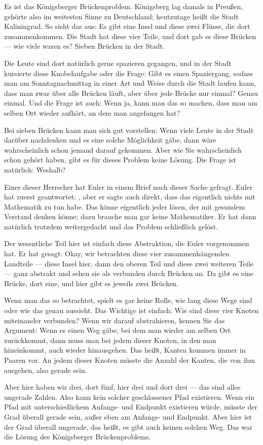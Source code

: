 \begin{spoken-clean}[00:05:40 - 00:08:08]
Es ist das Königsberger Brückenproblem. Königsberg lag damals in Preußen, gehörte also im weitesten Sinne zu Deutschland; heutzutage heißt die Stadt Kaliningrad. So sieht das aus: Es gibt eine Insel und diese zwei Flüsse, die dort zusammenkommen. Die Stadt hat diese vier Teile, und dort gab es diese Brücken --- wie viele waren es? Sieben Brücken in der Stadt.

Die Leute sind dort natürlich gerne spazieren gegangen, und in der Stadt kursierte diese Knobelaufgabe oder die Frage: Gibt es einen Spaziergang, sodass man am Sonntagnachmittag in einer Art und Weise durch die Stadt laufen kann, dass man zwar über alle Brücken läuft, aber über jede Brücke nur einmal? Genau einmal. Und die Frage ist auch: Wenn ja, kann man das so machen, dass man am selben Ort wieder aufhört, an dem man angefangen hat?

Bei sieben Brücken kann man sich gut vorstellen: Wenn viele Leute in der Stadt darüber nachdenken und es eine solche Möglichkeit gäbe, dann wäre wahrscheinlich schon jemand darauf gekommen. Aber wie Sie wahrscheinlich schon gehört haben, gibt es für dieses Problem keine Lösung. Die Frage ist natürlich: Weshalb?

Einer dieser Herrscher hat Euler in einem Brief nach dieser Sache gefragt. Euler hat zuerst geantwortet: , aber er sagte auch direkt, dass das eigentlich nichts mit Mathematik zu tun habe. Das könne eigentlich jeder lösen, der mit gesundem Verstand denken könne; dazu brauche man gar keine Mathematiker. Er hat dann natürlich trotzdem weitergedacht und das Problem schließlich gelöst.

Der wesentliche Teil hier ist einfach diese Abstraktion, die Euler vorgenommen hat. Er hat gesagt: Okay, wir betrachten diese vier zusammenhängenden Landteile --- diese Insel hier, dann den oberen Teil und diese zwei weiteren Teile --- ganz abstrakt und sehen sie als verbunden durch Brücken an. Da gibt es eine Brücke, dort eine, und hier gibt es jeweils zwei Brücken.

Wenn man das so betrachtet, spielt es gar keine Rolle, wie lang diese Wege sind oder wie das genau aussieht. Das Wichtige ist einfach: Wie sind diese vier Knoten miteinander verbunden? Wenn wir darauf abstrahieren, kennen Sie das Argument: Wenn es einen Weg gäbe, bei dem man wieder am selben Ort zurückkommt, dann muss man bei jedem dieser Knoten, in den man hineinkommt, auch wieder hinausgehen. Das heißt, Kanten kommen immer in Paaren vor. An jedem dieser Knoten müsste die Anzahl der Kanten, die von ihm ausgehen, also gerade sein.

Aber hier haben wir drei, dort fünf, hier drei und dort drei --- das sind alles ungerade Zahlen. Also kann kein solcher geschlossener Pfad existieren. Wenn ein Pfad mit unterschiedlichem Anfangs- und Endpunkt existieren würde, müsste der Grad überall gerade sein, außer eben am Anfangs- und Endpunkt. Aber hier ist der Grad überall ungerade, das heißt, es gibt auch keinen solchen Weg. Das war die Lösung des Königsberger Brückenproblems.
\end{spoken-clean}

